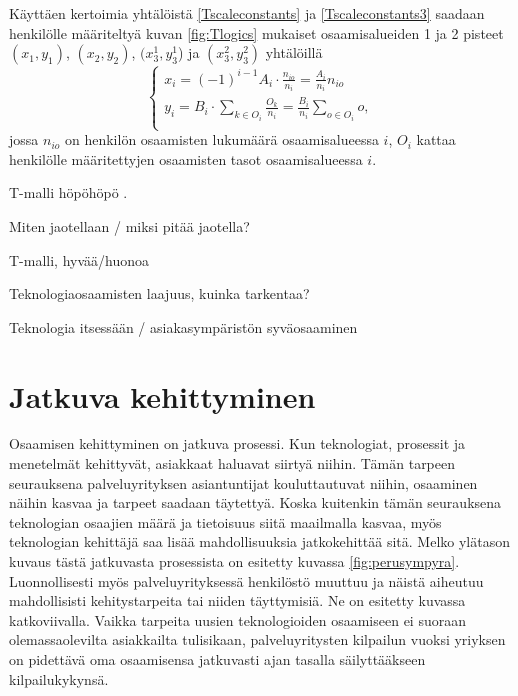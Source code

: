\documentclass[a4paper,finnish,12pt]{article}
\begin{document}
Käyttäen kertoimia yhtälöistä \eqref{Tscaleconstants} ja \eqref{Tscaleconstants3} saadaan henkilölle määriteltyä kuvan \ref{fig:Tlogics} mukaiset osaamisalueiden 1 ja 2 pisteet $(x_1, y_1)$, $(x_2, y_2)$, $(x_3^1, y_3^1$) ja $(x_3^2, y_3^2)$ yhtälöillä
\begin{equation}
\begin{cases}
x_i = (-1)^{i-1} A_i \cdot \frac{n_{io}}{n_i} = \frac{A_i}{n_i} n_{io} \\
y_i = B_i \cdot \sum_{k \in O_i} \frac{O_k}{n_i} = \frac{B_i}{n_i} \sum_{o \in O_i} o, \\
\end{cases}
\end{equation} jossa $n_{io}$ on henkilön osaamisten lukumäärä osaamisalueessa $i$, $O_i$ kattaa henkilölle määritettyjen osaamisten tasot osaamisalueessa $i$.


T-malli höpöhöpö \cite{T-malli}.

Miten jaotellaan / miksi pitää jaotella?

T-malli, hyvää/huonoa

Teknologiaosaamisten laajuus, kuinka tarkentaa?

Teknologia itsessään / asiakasympäristön syväosaaminen

\clearpage

\section{Jatkuva kehittyminen}

Osaamisen kehittyminen on jatkuva prosessi. Kun teknologiat, prosessit ja menetelmät kehittyvät, asiakkaat haluavat siirtyä niihin. Tämän tarpeen seurauksena palveluyrityksen asiantuntijat kouluttautuvat niihin, osaaminen näihin kasvaa ja tarpeet saadaan täytettyä. Koska kuitenkin tämän seurauksena teknologian osaajien määrä ja tietoisuus siitä maailmalla kasvaa, myös teknologian kehittäjä saa lisää mahdollisuuksia jatkokehittää sitä. Melko ylätason kuvaus tästä jatkuvasta prosessista on esitetty kuvassa \ref{fig:perusympyra}. Luonnollisesti myös palveluyrityksessä henkilöstö muuttuu ja näistä aiheutuu mahdollisisti kehitystarpeita tai niiden täyttymisiä. Ne on esitetty kuvassa katkoviivalla. Vaikka tarpeita uusien teknologioiden osaamiseen ei suoraan olemassaolevilta asiakkailta tulisikaan, palveluyritysten kilpailun vuoksi yriyksen on pidettävä oma osaamisensa jatkuvasti ajan tasalla säilyttääkseen kilpailukykynsä.
\end{document}
